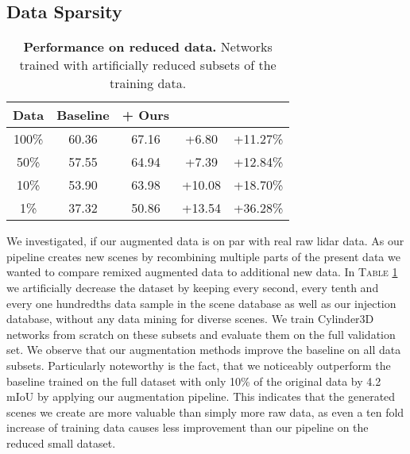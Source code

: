 \documentclass[letterpaper, 10 pt, conference]{ieeeconf}
\begin{document}
\subsection{Data Sparsity}
\begin{table}[!htbp]
	\caption{\textbf{Performance on reduced data.} Networks trained with artificially reduced subsets of the training data.}

	\begin{tabular}{ccccc}
		\hline
		Data  & Baseline & + Ours &  &  \\
		\hline
		
		100\% & 60.36 & 67.16 & +6.80 & +11.27\% \\
		
		50\% & 57.55 & 64.94 & +7.39 & +12.84\% \\
		
		10\% & 53.90 & 63.98 & +10.08 & +18.70\% \\
		
		1\% &  37.32 & 50.86 & +13.54 & +36.28\% \\
		\hline
	\end{tabular}
\label{tab:dataset-reduction}
	\centering
\end{table}


We investigated, if our augmented data is on par with real raw lidar data. As our pipeline creates new scenes by recombining multiple parts of the present data we wanted to compare remixed augmented data to additional new data. In \textsc{Table} \ref{tab:dataset-reduction} we artificially decrease the dataset by keeping every second, every tenth and every one hundredths data sample in the scene database as well as our injection database, without any data mining for diverse scenes. We train Cylinder3D \cite{zhou2020cylinder3d} networks from scratch on these subsets and evaluate them on the full validation set. We observe that our augmentation methods improve the baseline on all data subsets. Particularly noteworthy is the fact, that we noticeably outperform the baseline trained on the full dataset with only 10\% of the original data by 4.2 mIoU by applying our augmentation pipeline. This indicates that the generated scenes we create are more valuable than simply more raw data, as even a ten fold increase of training data causes less improvement than our pipeline on the reduced small dataset.
\end{document}

